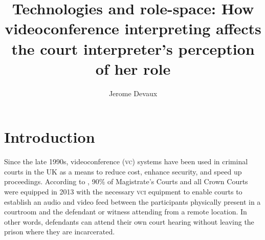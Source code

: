\documentclass[output=paper]{langsci/langscibook}
\author{Jerome Devaux\affiliation{The Open University}}
\title{Technologies and role-space: How videoconference interpreting affects the court interpreter’s perception of her role}
\begin{document}

 

 

 

 

 

 

 

 

 

 

 

\section{Introduction}
\label{sec:devaux:1}
Since the late 1990s, videoconference (\textsc{vc}) systems have been used in criminal courts in the UK \citep{Plotnikoff1999, Plotnikoff2000} as a means to reduce cost, enhance security, and speed up proceedings. According to \citep{Braun2016b}, 90\% of Magistrate’s Courts and all Crown Courts were equipped in 2013 with the necessary \textsc{vci} equipment to enable courts to establish an audio and video feed between the participants physically present in a courtroom and the defendant or witness attending from a remote location. In other words, defendants can attend their own court hearing without leaving the prison where they are incarcerated. 
\end{document}
